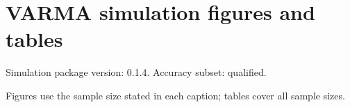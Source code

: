 \documentclass[10pt]{article}
\begin{document}
\section*{VARMA simulation figures and tables}
Simulation package version: 0.1.4. Accuracy subset: qualified. 
\par\medskip Figures use the sample size stated in each caption; tables cover all sample sizes.
\clearpage
\clearpage
\end{document}
